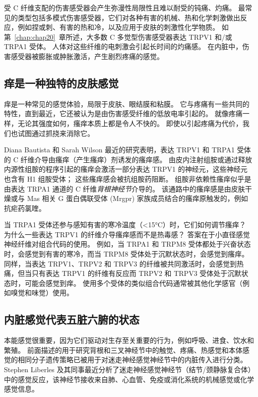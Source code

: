 受 C 纤维支配的伤害感受器会产生弥漫性局限性且难以耐受的钝痛、灼痛。
最常见的类型包括多模式伤害感受器，它们对各种有害的机械、热和化学刺激做出反应，例如捏或刺、有害的热和冷，以及应用于皮肤的刺激性化学物质。
如第~\ref{chap:chap20}~章所述，大多数 C 多觉型伤害感受器表达 TRPV1 和/或 TRPA1 受体。
人体对这些纤维的电刺激会引起长时间的灼痛感。
在内脏中，伤害感受器被膨胀或肿胀激活，产生剧烈疼痛的感觉。



\subsection{痒是一种独特的皮肤感觉}

痒是一种常见的感觉体验，局限于皮肤、眼结膜和粘膜。 
它与疼痛有一些共同的特性，直到最近，它还被认为是由伤害感受纤维的低放电率引起的。
就像疼痛一样，无论其强度如何，瘙痒本质上都是令人不快的。
即使以引起疼痛为代价，我们也试图通过抓挠来消除它。


Diana Bautista 和 Sarah Wilson 最近的研究表明，表达 TRPV1 和 TRPA1 受体的 C 纤维介导由瘙痒（产生瘙痒）剂诱发的瘙痒感。
由皮内注射组胺或通过释放内源性组胺的程序引起的瘙痒会激活一部分表达 TRPV1 的神经元，这些神经元也含有 H1 组胺受体；
这些瘙痒感会被抗组胺药阻断。
组胺非依赖性瘙痒似乎是由表达 TRPA1 通道的 C 纤维\textit{背根神经节}介导的。
该通路中的瘙痒感是由皮肤干燥或与 Mas 相关 G 蛋白偶联受体 (Mrgpr) 家族成员结合的瘙痒原触发的，例如抗疟药氯喹。


当 TRPA1 受体还参与感知有害的寒冷温度（<15°C）时，它们如何调节瘙痒？
为什么一些表达 TRPV1 的纤维介导瘙痒感而不是热毒感？
答案在于小直径感觉神经纤维对组合代码的使用。
例如，当 TRPA1 和 TRPM8 受体都处于兴奋状态时，会感觉到有害的寒冷，而当 TRPM8 受体处于沉默状态时，会感觉到瘙痒。
同样，当表达 TRPV1、TRPV2 和 TRPV3 的纤维被共同激活时，会感觉到热痛，但当只有表达 TRPV1 的纤维有反应而 TRPV2 和 TRPV3 受体处于沉默状态时，可能会感觉到痒。
使用多个受体的类似组合代码通常被其他化学感官（例如嗅觉和味觉）使用。



\subsection{内脏感觉代表五脏六腑的状态}

本能感觉很重要，因为它们驱动对生存至关重要的行为，例如呼吸、进食、饮水和繁殖。
前面描述的用于研究背根和三叉神经节中的触觉、疼痛、热感觉和本体感觉的相同分子遗传策略已被用于对迷走神经感觉神经节中的内脏传入进行分类。
Stephen Liberles 及其同事最近分析了迷走神经感觉神经节（结节/颈静脉复合体）中的感觉反应，该神经节接收来自肺、心血管、免疫或消化系统的机械感觉或化学感觉信息。


